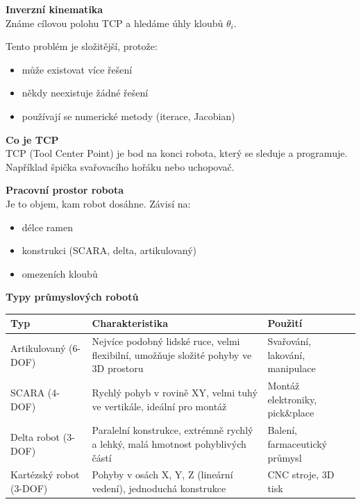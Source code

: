 \documentclass[a4paper,10pt]{article}
\begin{document}
\begin{vysvetlenibox}
\begin{vzorcebox}
\textbf{Inverzní kinematika}\\
Známe cílovou polohu TCP a hledáme úhly kloubů $\theta_i$.

Tento problém je složitější, protože:
\begin{itemize}[noitemsep]
    \item může existovat více řešení
    \item někdy neexistuje žádné řešení
    \item používají se numerické metody (iterace, Jacobian)
\end{itemize}

\end{vzorcebox}

\textbf{Co je TCP}\\
TCP (Tool Center Point) je bod na konci robota, který se sleduje
a programuje. Například špička svařovacího hořáku nebo uchopovač.

\textbf{Pracovní prostor robota}\\
Je to objem, kam robot dosáhne.
Závisí na:
\begin{itemize}[noitemsep]
    \item délce ramen
    \item konstrukci (SCARA, delta, artikulovaný)
    \item omezeních kloubů
\end{itemize}

\textbf{Typy průmyslových robotů}

\begin{center}
\begin{tabularx}{0.95\linewidth}{@{} l X l @{}}
\toprule
\textbf{Typ} & \textbf{Charakteristika} & \textbf{Použití} \\
\midrule

Artikulovaný (6-DOF) &
Nejvíce podobný lidské ruce, velmi flexibilní,
umožňuje složité pohyby ve 3D prostoru &
Svařování, lakování, manipulace \\

SCARA (4-DOF) &
Rychlý pohyb v rovině XY, velmi tuhý ve vertikále,
ideální pro montáž &
Montáž elektroniky, pick\&place \\

Delta robot (3-DOF) &
Paralelní konstrukce, extrémně rychlý a lehký,
malá hmotnost pohyblivých částí &
Balení, farmaceutický průmysl \\

Kartézský robot (3-DOF) &
Pohyby v osách X, Y, Z (lineární vedení),
jednoduchá konstrukce &
CNC stroje, 3D tisk \\


\end{tabularx}
\end{center}
\end{vysvetlenibox}
\end{document}
